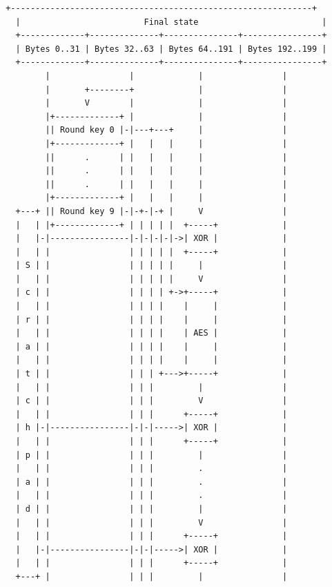 \begin{verbatim}
 +-------------------------------------------------------------+
   |                         Final state                         |
   +-------------+--------------+---------------+----------------+
   | Bytes 0..31 | Bytes 32..63 | Bytes 64..191 | Bytes 192..199 |
   +-------------+--------------+---------------+----------------+
         |                |             |                |
         |       +--------+             |                |
         |       V        |             |                |
         |+-------------+ |             |                |
         || Round key 0 |-|---+---+     |                |
         |+-------------+ |   |   |     |                |
         ||      .      | |   |   |     |                |
         ||      .      | |   |   |     |                |
         ||      .      | |   |   |     |                |
         |+-------------+ |   |   |     |                |
   +---+ || Round key 9 |-|-+-|-+ |     V                |
   |   | |+-------------+ | | | | |  +-----+             |
   |   |-|----------------|-|-|-|-|->| XOR |             |
   |   | |                | | | | |  +-----+             |
   | S | |                | | | | |     |                |
   |   | |                | | | | |     V                |
   | c | |                | | | | +->+-----+             |
   |   | |                | | | |    |     |             |
   | r | |                | | | |    |     |             |
   |   | |                | | | |    | AES |             |
   | a | |                | | | |    |     |             |
   |   | |                | | | |    |     |             |
   | t | |                | | | +--->+-----+             |
   |   | |                | | |         |                |
   | c | |                | | |         V                |
   |   | |                | | |      +-----+             |
   | h |-|----------------|-|-|----->| XOR |             |
   |   | |                | | |      +-----+             |
   | p | |                | | |         |                |
   |   | |                | | |         .                |
   | a | |                | | |         .                |
   |   | |                | | |         .                |
   | d | |                | | |         |                |
   |   | |                | | |         V                |
   |   | |                | | |      +-----+             |
   |   |-|----------------|-|-|----->| XOR |             |
   |   | |                | | |      +-----+             |
   +---+ |                | | |         |                |

\end{verbatim}

